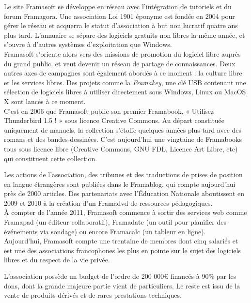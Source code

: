 \documentclass[10pt,a4paper, twoside]{report}
\begin{document}
	Le site Framasoft se développe en réseau avec l'intégration de tutoriels et du forum Framagora. Une association Loi 1901 éponyme est fondée en 2004 pour gérer le réseau et acquerra le statut d'association à but non lucratif quatre ans plus tard. L'annuaire se sépare des logiciels gratuits non libres la même année, et s'ouvre à d'autres systèmes d'exploitation que Windows.
	\\
	
	Framasoft s'oriente alors vers des missions de promotion du logiciel libre auprès du grand public, et veut devenir un réseau de partage de connaissances. Deux autres axes de campagnes sont également abordés à ce moment : la culture libre et les services libres. Des projets comme la \textit{Framakey}, une clé USB contenant une sélection de logiciels libres à utiliser directement sous Windows, Linux ou MacOS X sont lancés à ce moment.
	\\
	
	C'est en 2006 que Framasoft publie son premier Framabook, « Utilisez Thunderbird 1.5 ! » sous licence Creative Commons. Au départ constituée uniquement de manuels, la collection s'étoffe quelques années plus tard avec des romans et des bandes-dessinées. C'est aujourd'hui une vingtaine de Framabooks tous sous licence libre (Creative Commons, GNU FDL, Licence Art Libre, etc) qui constituent cette collection.
	
	Les actions de l'association, des tribunes et des traductions de prises de position en langue étrangères sont publiées dans le Framablog, qui compte aujourd'hui près de 2000 articles. Des partenariats avec l'Éducation Nationale aboutissent en 2009 et 2010 à la création d'un Framadvd de ressources pédagogiques.
	\\
	
	À compter de l'année 2011, Framasoft commence à sortir des services web comme Framapad (un éditeur collaboratif), Framadate (un outil pour planifier des événements via sondage) ou encore Framacalc (un tableur en ligne).
	\\
	
	Aujourd'hui, Framasoft compte une trentaine de membres dont cinq salariés et est une des associations francophones les plus en pointe sur le sujet des logiciels libres et du respect de la vie privée.
	
	L'association possède un budget de l'ordre de 200 000\euro{} financés à 90\% par les dons, dont la grande majeure partie vient de particuliers. Le reste est issu de la vente de produits dérivés et de rares prestations techniques.
	\\
	
\end{document}
